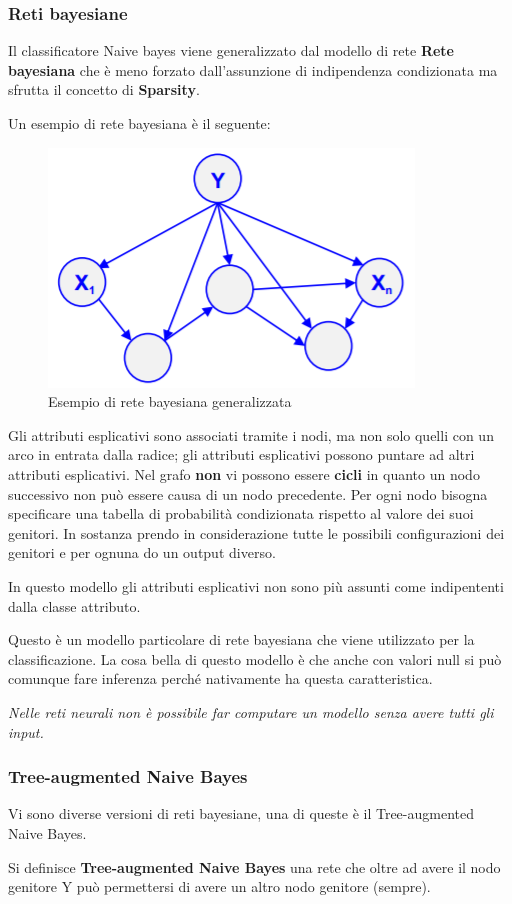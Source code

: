 \subsubsection{Reti bayesiane}
Il classificatore Naive bayes viene generalizzato dal modello di rete \textbf{Rete bayesiana} che è meno forzato dall'assunzione di indipendenza condizionata ma sfrutta il concetto di \textbf{Sparsity}. 

Un esempio di rete bayesiana è il seguente:

\begin{figure}[H]
	\centering
	\includegraphics[height=0.35 \linewidth]{classification/pict/networkbayes.png}
	\caption{Esempio di rete bayesiana generalizzata}
\end{figure}
Gli attributi esplicativi sono associati tramite i nodi, ma non solo quelli con un arco in entrata dalla radice; gli attributi esplicativi possono puntare ad altri attributi esplicativi.
Nel grafo \textbf{non} vi possono essere \textbf{cicli} in quanto un nodo successivo non può essere causa di un nodo precedente. Per ogni nodo bisogna specificare una tabella di probabilità condizionata rispetto al valore dei suoi genitori. In sostanza prendo in considerazione tutte le possibili configurazioni dei genitori e per ognuna do un output diverso. 

In questo modello gli attributi esplicativi non sono più assunti come indipententi dalla classe attributo.

Questo è un modello particolare di rete bayesiana che viene utilizzato per la classificazione. La cosa bella di questo modello è che anche con valori null si può comunque fare inferenza perché nativamente ha questa caratteristica. 

\textit{Nelle reti neurali non è possibile far computare un modello senza avere tutti gli input. }

\subsubsection{Tree-augmented Naive Bayes}
Vi sono diverse versioni di reti bayesiane, una di queste è il Tree-augmented Naive Bayes.
\begin{defn}
Si definisce \textbf{Tree-augmented Naive Bayes} una rete che oltre ad avere il nodo genitore Y può permettersi di avere un altro nodo genitore (sempre). 
\end{defn}

